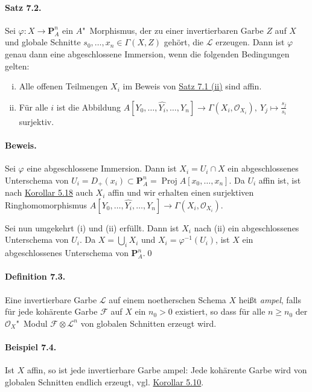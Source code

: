 \paragraph{Satz 7.2.}\label{7.2} Sei $\varphi:X\to\mathbf{P}_A^n$ ein $A$"~Morphismus, der zu einer invertierbaren Garbe $Z$ auf $X$ und globale Schnitte $s_0,\ldots,x_n\in\Gamma(X,Z)$ gehört, die $\mathcal{L}$ erzeugen. Dann ist $\varphi$ genau dann eine abgeschlossene Immersion, wenn die folgenden Bedingungen gelten:
\begin{enumerate}[(i)]
\item Alle offenen Teilmengen $X_i$ im Beweis von \hyperref[7.1]{Satz 7.1 (ii)} sind affin.
\item Für alle $i$ ist die Abbildung $A[Y_0,\ldots,\widehat{Y_i},\ldots,Y_n]\to\Gamma(X_i,\mathcal{O}_{X_i}),\ Y_j\mapsto \frac{s_j}{s_i}$ surjektiv.
\end{enumerate}

\paragraph{Beweis.} Sei $\varphi$ eine abgeschlossene Immersion. Dann ist $X_i=U_i\cap X$ ein abgeschlossenes Unterschema von $U_i=D_+(x_i)\subset\mathbf{P}_A^n=\operatorname{Proj}A[x_0,\ldots,x_n]$. Da $U_i$ affin ist, ist nach \hyperref[5.18]{Korollar 5.18} auch $X_i$ affin und wir erhalten einen surjektiven Ringhomomorphismus $A[Y_0,\ldots,\widehat{Y_i},\ldots,Y_n]\to \Gamma(X_i,\mathcal{O}_{X_i})$.

Sei nun umgekehrt (i) und (ii) erfüllt. Dann ist $X_i$ nach (ii) ein abgeschlossenes Unterschema von $U_i$. Da $X=\bigcup_i X_i$ und $X_i=\varphi^{-1}(U_i)$, ist $X$ ein abgeschlossenes Unterschema von $\mathbf{P}_A^n$.\qed

\paragraph{Definition 7.3.}\label{7.3} Eine invertierbare Garbe $\mathcal{L}$ auf einem noetherschen Schema $X$ heißt \textit{ampel}, falls für jede kohärente Garbe $\mathcal{F}$ auf $X$ ein $n_0>0$ existiert, so dass für alle $n\geq n_0$ der $\mathcal{O}_X$"~Modul $\mathcal{F}\otimes\mathcal{L}^n$ von globalen Schnitten erzeugt wird.

\paragraph{Beispiel 7.4.}\label{7.4} Ist $X$ affin, so ist jede invertierbare Garbe ampel: Jede kohärente Garbe wird von globalen Schnitten endlich erzeugt, vgl. \hyperref[5.10]{Korollar 5.10}.

